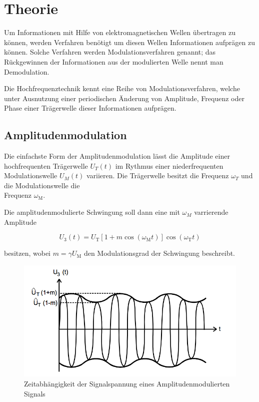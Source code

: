 \section{Theorie}
Um Informationen mit Hilfe von elektromagnetischen Wellen übertragen zu können, werden Verfahren benötigt um diesen Wellen Informationen aufprägen zu können. Solche Verfahren werden Modulationsverfahren genannt; das Rückgewinnen der Informationen aus der modulierten Welle nennt man Demodulation.

Die Hochfrequenztechnik kennt eine Reihe von Modulationsverfahren, welche unter Ausnutzung einer periodischen Änderung von Amplitude, Frequenz oder Phase einer Trägerwelle dieser Informationen aufprägen.

\subsection{Amplitudenmodulation}
Die einfachste Form der Amplitudenmodulation lässt die Amplitude einer hochfrequenten Trägerwelle $U_T(t)$ im Rythmus einer niederfrequenten Modulationswelle $U_M(t)$ variieren. Die Trägerwelle besitzt die Frequenz $\omega_T$ und die Modulationswelle die \\
Frequenz $\omega_\text{M}$.

Die amplitudenmodulierte Schwingung soll dann eine mit $\omega_M$ varrierende Amplitude

\begin{equation}
U_{3}(t) = U_\text{T} \left[1 + m \cos( \omega_\text{M} t)\right]\cos(\omega_\text{T} t)
\label{eq:AmMod}
\end{equation} 

besitzen, wobei $m = \gamma U_\text{M}$ den  Modulationsgrad der Schwingung beschreibt.

\begin{figure}
	\centering
	\includegraphics[width=\textwidth]{img/Abb1.png}
	\caption{Zeitabhängigkeit der Signalspannung eines Amplitudenmodulierten Signals \cite{FP}}
\end{figure}


